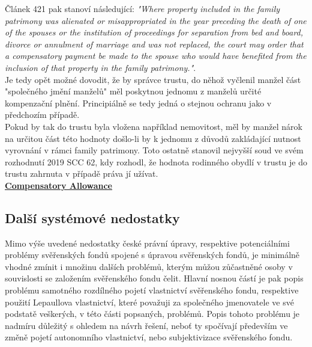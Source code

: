\documentclass{article}
\begin{document}
Článek 421 pak stanoví následující: \textit{"Where property included in the family patrimony was alienated or misappropriated in the year preceding the death of one of the spouses or the institution of proceedings for separation from bed and board, divorce or annulment of marriage and was not replaced, the court may order that a compensatory payment be made to the spouse who would have benefited from the inclusion of that property in the family patrimony."}.\\

Je tedy opět možné dovodit, že by správce trustu, do něhož vyčlenil manžel část "společného jmění manželů" měl poskytnou jednomu z manželů určité kompenzační plnění. Principiálně se tedy jedná o stejnou ochranu jako v předchozím případě.\\

Pokud by tak do trustu byla vložena například nemovitost, měl by manžel nárok na určitou část této hodnoty došlo-li by k jednomu z důvodů zakládající nutnost vyrovnání v rámci family patrimony. Toto ostatně stanovil nejvyšší soud ve svém rozhodnutí 2019 SCC 62, kdy rozhodl, že hodnota rodinného obydlí v trustu je do trustu zahrnuta v případě práva jí užívat.\\

\underline{\textbf{Compensatory Allowance}}\\

\subsection{Další systémové nedostatky}

Mimo výše uvedené nedostatky české právní úpravy, respektive potenciálními problémy svěřenských fondů spojené s úpravou svěřenských fondů, je minimálně vhodné zmínit i množinu dalších problémů, kterým můžou zůčastněné osoby v souvislosti se založením svěřenského fondu čelit. Hlavní nosnou částí je pak popis problému samotného rozdílného pojetí vlastnictví svěřenského fondu, respektive použití Lepaullova vlastnictví, které považuji za společného jmenovatele ve své podstatě veškerých, v této části popsaných, problémů. Popis tohoto problému je nadmíru důležitý s ohledem na návrh řešení, neboť ty spočívají především ve změně pojetí autonomního vlastnictví, nebo subjektivizace svěřenského fondu.\\

\end{document}
